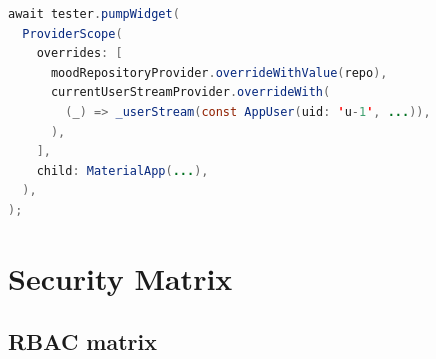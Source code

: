 \documentclass[11pt,a4paper]{article}
\begin{document}
\begin{lstlisting}[language=Java]
await tester.pumpWidget(
  ProviderScope(
    overrides: [
      moodRepositoryProvider.overrideWithValue(repo),
      currentUserStreamProvider.overrideWith(
        (_) => _userStream(const AppUser(uid: 'u-1', ...)),
      ),
    ],
    child: MaterialApp(...),
  ),
);
\end{lstlisting}

\section{Security Matrix}

\subsection{RBAC matrix}
\end{document}
